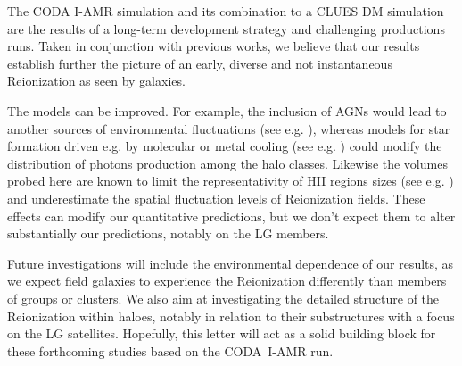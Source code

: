\documentclass[twocolumn]{aastex61}
\begin{document}
The CODA I-AMR simulation and its combination to a CLUES DM simulation are the results of a long-term development strategy and  challenging productions runs. Taken in conjunction with previous works, we believe that our results establish further the picture of an early, diverse and not instantaneous Reionization as seen by galaxies. 

The models can be improved. For example, the inclusion of AGNs would lead to another sources of environmental fluctuations (see e.g. \citet{CHA15}), whereas models for star formation driven e.g. by molecular or metal cooling (see e.g. \citet{WIS9}) could modify the distribution of photons production among the halo classes. Likewise the volumes probed here are known to limit the representativity of HII regions sizes (see e.g. \citet{ILI6}) and underestimate the spatial fluctuation levels of Reionization fields. These effects can modify our quantitative predictions, but we don't expect them to alter substantially our predictions, notably on the LG members.

Future investigations will include the environmental dependence of our results, as we expect field galaxies to experience the Reionization differently than members of groups or clusters. We also aim at investigating the detailed structure of the Reionization within haloes, notably in relation to their substructures with a focus on the LG satellites.  Hopefully, this letter will act as a solid building block for these forthcoming studies based on the CODA~I-AMR run.


\end{document}

